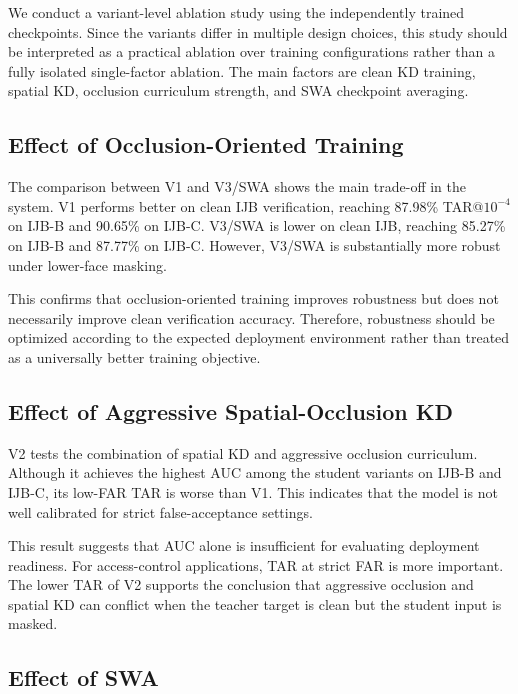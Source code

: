 We conduct a variant-level ablation study using the independently trained checkpoints. Since the variants differ in multiple design choices, this study should be interpreted as a practical ablation over training configurations rather than a fully isolated single-factor ablation. The main factors are clean KD training, spatial KD, occlusion curriculum strength, and SWA checkpoint averaging\cite{izmailov2019averagingweightsleadswider}.


\subsection{Effect of Occlusion-Oriented Training}

The comparison between V1 and V3/SWA shows the main trade-off in the system. V1 performs better on clean IJB verification, reaching 87.98\% TAR@$10^{-4}$ on IJB-B and 90.65\% on IJB-C. V3/SWA is lower on clean IJB, reaching 85.27\% on IJB-B and 87.77\% on IJB-C. However, V3/SWA is substantially more robust under lower-face masking\cite{ijbb,ijbc}.



This confirms that occlusion-oriented training improves robustness but does not necessarily improve clean verification accuracy. Therefore, robustness should be optimized according to the expected deployment environment rather than treated as a universally better training objective.

\subsection{Effect of Aggressive Spatial-Occlusion KD}

V2 tests the combination of spatial KD and aggressive occlusion curriculum. Although it achieves the highest AUC among the student variants on IJB-B and IJB-C, its low-FAR TAR is worse than V1. This indicates that the model is not well calibrated for strict false-acceptance settings\cite{ijbb,ijbc}.



This result suggests that AUC alone is insufficient for evaluating deployment readiness. For access-control applications, TAR at strict FAR is more important. The lower TAR of V2 supports the conclusion that aggressive occlusion and spatial KD can conflict when the teacher target is clean but the student input is masked.

\subsection{Effect of SWA}

